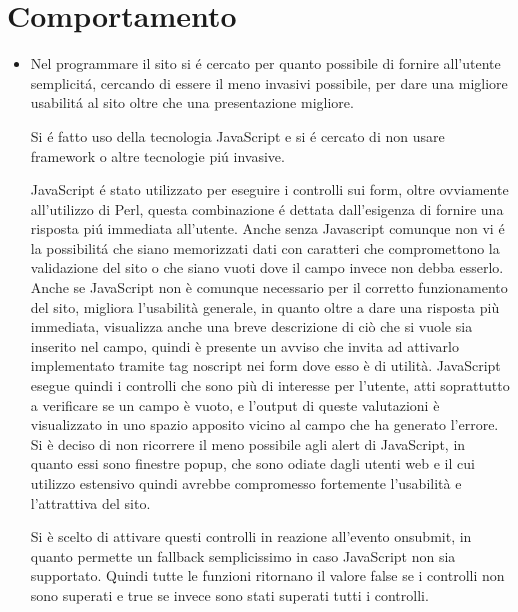 \documentclass[12pt]{article}
\begin{document}
			\section{Comportamento}
			\begin{itemize}
				\item Nel programmare il sito si \'e cercato per quanto possibile di fornire all'utente semplicit\'a, cercando di essere il meno invasivi possibile, per dare una migliore usabilit\'a al sito oltre che una presentazione migliore.
				
				Si \'e fatto uso della tecnologia JavaScript e si \'e cercato di non usare framework o altre tecnologie pi\'u invasive.
				
				JavaScript \'e stato utilizzato per eseguire i controlli sui form, oltre ovviamente all'utilizzo di Perl, questa combinazione \'e dettata dall'esigenza di fornire una risposta pi\'u immediata all'utente. Anche senza Javascript comunque non vi \'e la possibilit\'a che siano memorizzati dati con caratteri che compromettono la validazione del sito o che siano vuoti dove il campo invece non debba esserlo.
				Anche se JavaScript non è comunque necessario per il corretto funzionamento del sito, migliora
				l'usabilità generale, in quanto oltre a dare una risposta più immediata, visualizza anche una breve
				descrizione di ciò che si vuole sia inserito nel campo, quindi è presente un avviso che invita ad
				attivarlo implementato tramite tag noscript nei form dove esso è di utilità.
				JavaScript esegue quindi i controlli che sono più di interesse per l'utente, atti soprattutto a verificare
				se un campo è vuoto, e l'output di queste valutazioni è visualizzato in uno spazio apposito vicino al
				campo che ha generato l'errore.
				Si è  deciso di non  ricorrere il meno possibile agli alert di JavaScript, in quanto essi sono finestre
				popup, che sono odiate dagli utenti web e il cui utilizzo estensivo quindi avrebbe compromesso
				fortemente l'usabilità e l'attrattiva del sito.
				
				
				Si è scelto di attivare questi controlli in reazione all'evento onsubmit, in quanto permette un
				fallback semplicissimo in caso JavaScript non sia supportato. Quindi tutte le funzioni ritornano il
				valore false se i controlli non sono superati e true se invece sono stati superati tutti i controlli.
				

\end{itemize}
\end{document}
